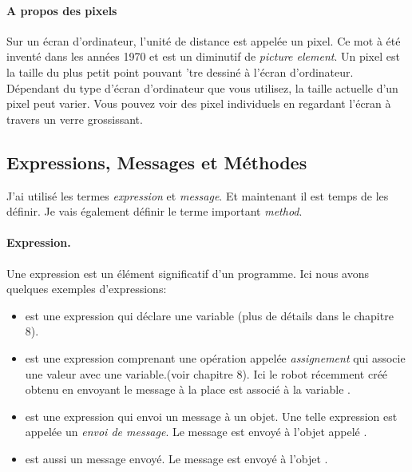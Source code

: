 \documentclass[a4paper,10pt,twoside]{book}
\begin{document}
\paragraph{A propos des pixels}

Sur un \'ecran d'ordinateur, l'unit\'e de distance est appel\'ee un pixel. Ce mot \`a \'et\'e invent\'e dans les ann\'ees 1970 et est un diminutif de \emph{picture element}. Un pixel est la taille du plus petit point pouvant 'tre dessin\'e \`a l'\'ecran d'ordinateur. D\'ependant du type d'\'ecran d'ordinateur que vous utilisez, la taille actuelle d'un pixel peut varier. Vous pouvez voir des pixel individuels en regardant l'\'ecran \`a travers un verre grossissant.


\subsection{Expressions, Messages et M\'ethodes}

J'ai utilis\'e les termes \emph{expression} et \emph{message}. Et maintenant il est temps de les d\'efinir. Je vais \'egalement d\'efinir le terme important \emph{method}.

\paragraph{Expression.}
Une expression est un \'el\'ement significatif d'un programme. Ici nous avons quelques exemples d'expressions:
\begin{itemize} 
\item {} est une expression qui d\'eclare une variable (plus de d\'etails dans le chapitre 8).

\item {} est une expression comprenant une op\'eration appel\'ee \emph{assignement} qui associe une valeur avec une variable.(voir chapitre 8). Ici le robot r\'ecemment cr\'e\'e obtenu en envoyant le message   \`a la place  est associ\'e \`a la variable .

\item {} est une expression qui envoi un message \`a un objet. Une telle expression est appel\'ee un \emph{envoi de message}. Le message  est envoy\'e \`a l'objet appel\'e . 

\item {} est aussi un message envoy\'e. Le message  est envoy\'e \`a l'objet . 
\end{itemize}
\end{document}
